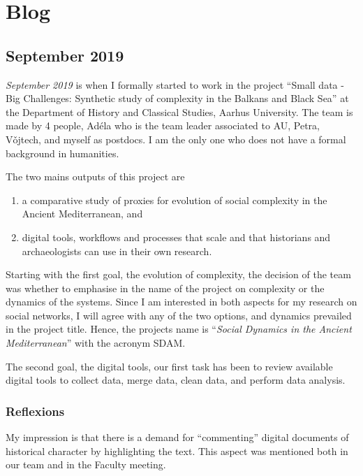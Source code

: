 \documentclass[oneside,a4paper]{memoir} %
\begin{document}
\chapter{B\textbf{log}}

\section{September 2019}

\emph{September 2019} is when I formally started to work in the project \enquote{Small data - Big Challenges: Synthetic study of complexity in the Balkans and Black Sea} at the Department of History and Classical Studies, Aarhus University. 
The team is made by 4 people, Adéla who is the team leader associated to \gls{AU}, Petra, V\v{o}jtech, and myself as postdocs. I am the only one who does not have a formal background in humanities.

\bigbreak\noindent
The two mains outputs of this project are 

\begin{enumerate} %
      \item a comparative study of proxies for evolution of social complexity in the Ancient Mediterranean, and 
      \item digital tools, workflows and processes that scale and that historians and archaeologists can use in their own research.
\end{enumerate}

\noindent
Starting with the first goal, the evolution of complexity, the decision of the team was whether to emphasise in the name of the project on complexity or the dynamics of the systems. Since I am interested in both aspects for my research on social networks, I will agree with any of the two options, and dynamics prevailed in the project title. Hence, the projects name is \enquote{\emph{Social Dynamics in the Ancient Mediterranean}} with the acronym \gls{SDAM}.

The second goal, the digital tools, our first task has been to review available digital tools to collect data, merge data, clean data, and perform data analysis.


\subsection{Reflexions}
My impression is that there is a demand for \enquote{commenting} digital documents of historical character by highlighting the text. This aspect was mentioned both in our team and in the Faculty meeting.
\end{document}
